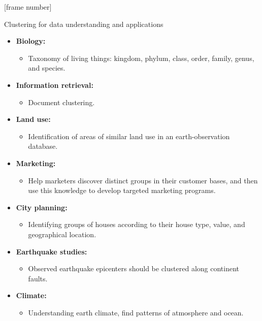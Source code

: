 \documentclass[aspectratio=169,t,xcolor=dvipsnames]{beamer}
\begin{document}
  {
    [frame number]
    \begin{frame}{Clustering for data understanding and applications}
        \begin{itemize}
          \item \textbf{Biology:}
          \begin{itemize}
            \item Taxonomy of living things: kingdom, phylum, class, order, family, genus, and species.
          \end{itemize}
          \item \textbf{Information retrieval:}
          \begin{itemize}
            \item Document clustering.
          \end{itemize}
          \item \textbf{Land use:}
          \begin{itemize}
            \item Identification of areas of similar land use in an earth-observation database.
          \end{itemize}
          \item \textbf{Marketing:}
          \begin{itemize}
            \item Help marketers discover distinct groups in their customer bases, and then use this knowledge to develop targeted marketing programs.
          \end{itemize}
          \item \textbf{City planning:}
          \begin{itemize}
            \item Identifying groups of houses according to their house type, value, and geographical location.
          \end{itemize}
          \item \textbf{Earthquake studies:}
          \begin{itemize}
            \item Observed earthquake epicenters should be clustered along continent faults.
          \end{itemize}
          \item \textbf{Climate:}
          \begin{itemize}
            \item Understanding earth climate, find patterns of atmosphere and ocean.
          \end{itemize}
        \end{itemize}
    \end{frame}
  }
\end{document}
